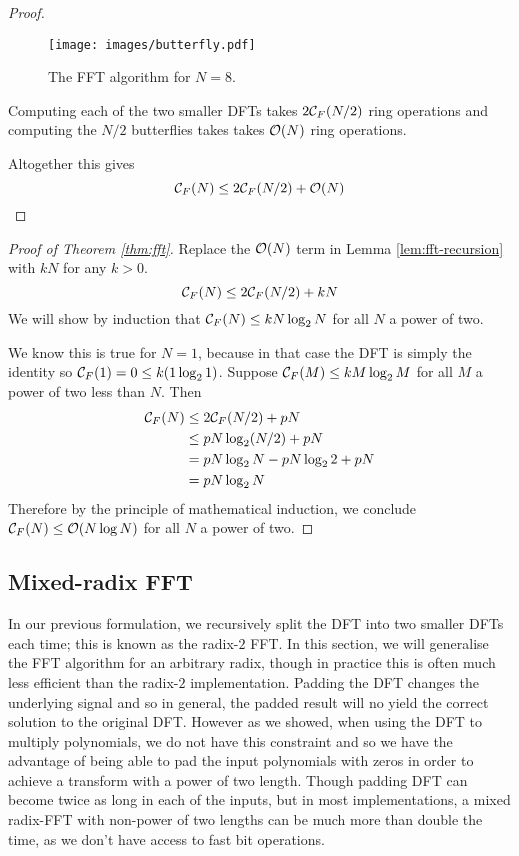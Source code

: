 \begin{proof}
    \begin{figure}[t]
        \centering
        \texttt{[image: images/butterfly.pdf]}
        \caption{The FFT algorithm for $N = 8$.}
        \label{fig:butterflies}
    \end{figure}

    Computing each of the two smaller DFTs takes $2\mathcal C_F(N/2)$ ring operations and computing the $N/2$ butterflies takes takes $\mathcal O(N)$ ring operations.

    Altogether this gives
    \[
        \mathcal C_F(N) \le 2 \mathcal C_F(N/2) + \mathcal O(N)
    \]
\end{proof}

\begin{proof}[Proof of Theorem \ref{thm:fft}]

    Replace the $\mathcal O(N)$ term in Lemma \ref{lem:fft-recursion} with $kN$ for any $k > 0$.
    \[
        \mathcal C_F(N) \le 2 \mathcal C_F(N/2) + kN
    \]
    We will show by induction that $\mathcal C_F(N) \le kN\log_2 N$ for all $N$ a power of two.

    We know this is true for $N = 1$, because in that case the DFT is simply the identity so $\mathcal C_F(1) = 0 \le k(1 \log_2 1)$.
    Suppose $\mathcal C_F(M) \le kM\log_2 M$ for all $M$ a power of two less than $N$. Then
    \begin{align*}
        \mathcal C_F(N)
        &\le 2\mathcal C_F(N/2) + pN\\
        &\le pN\log_2 (N/2) + pN\\
        &= pN\log_2 N - pN\log_2 2 + pN\\
        &= pN\log_2 N
    \end{align*}
    Therefore by the principle of mathematical induction, we conclude $\mathcal C_F(N) \le \mathcal O(N \log N)$ for all $N$ a power of two.
\end{proof}


\subsection{Mixed-radix FFT}

In our previous formulation, we recursively split the DFT into two smaller DFTs each time; this is known as the radix-$2$ FFT. In this section, we will generalise the FFT algorithm for an arbitrary radix, though in practice this is often much less efficient than the radix-$2$ implementation. Padding the DFT changes the underlying signal and so in general, the padded result will no yield the correct solution to the original DFT. However as we showed, when using the DFT to multiply polynomials, we do not have this constraint and so we have the advantage of being able to pad the input polynomials with zeros in order to achieve a transform with a power of two length. Though padding DFT can become twice as long in each of the inputs, but in most implementations, a mixed radix-FFT with non-power of two lengths can be much more than double the time, as we don't have access to fast bit operations.

